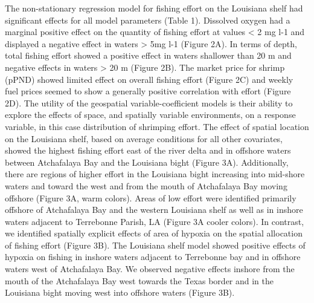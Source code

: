 \documentclass[10pt]{article}
\begin{document}
The non-stationary regression model for fishing effort on the Louisiana shelf had significant effects for all model parameters (Table 1).  Dissolved oxygen had a marginal positive effect on the quantity of fishing effort at values < 2 mg l-1 and displayed a negative effect in waters > 5mg l-1 (Figure 2A).  In terms of depth, total fishing effort showed a positive effect in waters shallower than 20 m and negative effects in waters > 20 m (Figure 2B).  The market price for shrimp (pPND) showed limited effect on overall fishing effort (Figure 2C) and weekly fuel prices seemed to show a generally positive correlation with effort (Figure 2D).  The utility of the geospatial variable-coefficient models is their ability to explore the effects of space, and spatially variable environments, on a response variable, in this case distribution of shrimping effort.  The effect of spatial location on the Louisiana shelf, based on average conditions for all other covariates, showed the highest fishing effort east of the river delta and in offshore waters between Atchafalaya Bay and the Louisiana bight (Figure 3A).  Additionally, there are regions of higher effort in the Louisiana bight increasing into mid-shore waters and toward the west and from the mouth of Atchafalaya Bay moving offshore (Figure 3A, warm colors).  Areas of low effort were identified primarily offshore of Atchafalaya Bay and the western Louisiana shelf as well as in inshore waters adjacent to Terrebonne Parish, LA (Figure 3A cooler colors).  In contrast, we identified spatially explicit effects of area of hypoxia on the spatial allocation of fishing effort (Figure 3B).  The Louisiana shelf model showed positive effects of hypoxia on fishing in inshore waters adjacent to Terrebonne bay and in offshore waters west of Atchafalaya Bay.  We observed negative effects inshore from the mouth of the Atchafalaya Bay west towards the Texas border and in the Louisiana bight moving west into offshore waters (Figure 3B). 
\end{document}
